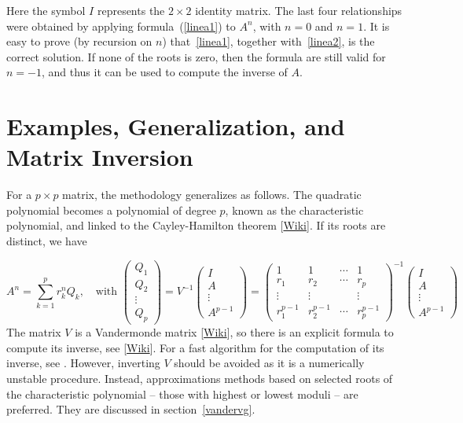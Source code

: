 \documentclass[oneside,10pt]{book}
\begin{document}
Here the symbol $I$ represents the $2 \times 2$ identity matrix. The last four relationships were obtained by applying formula~(\ref{linea1}) to $A^n$, with $n = 0$ and $n = 1$. 
It is easy to prove (by recursion on $n$) that~\ref{linea1}, together with~\ref{linea2}, is the correct solution. If none of the roots is zero, then the formula are still valid for $n = -1$, and thus it can be used to compute the inverse of $A$.

\section{Examples, Generalization, and Matrix Inversion}\label{slin1}

For a $p \times p$ matrix, the methodology generalizes as follows. The quadratic polynomial becomes a polynomial of degree $p$, known as the 
\textcolor{index}{characteristic polynomial}, and linked to the \textcolor{index}{Cayley-Hamilton theorem} [\href{https://en.wikipedia.org/wiki/Cayley\%E2\%80\%93Hamilton_theorem}{Wiki}]. If its roots are distinct, we have

\begin{equation}\label{linea11}
A^n=\sum_{k=1}^p r_k^n Q_k, \quad\text{with } \left(
\begin{aligned}
      Q_1\\
     Q_2 \\
     \vdots \\
    Q_p
\end{aligned}
\right) = V^{-1} \left(
\begin{array}{c}
      I \\
     A \\
     \vdots \\
    A^{p-1}
\end{array}
\right)  =\left(
\begin{array}{cccc}
      1 & 1 & \cdots & 1 \\
     r_1 & r_2 & \cdots & r_p \\
     \vdots & \vdots &  & \vdots \\
    r_1^{p-1} &  r_2^{p-1} &\cdots  &  r_p^{p-1}
\end{array}
\right)^{-1} \left(
\begin{array}{c}
      I \\
     A \\
     \vdots \\
    A^{p-1}
\end{array}
\right)
\end{equation}
The matrix $V$ is a \textcolor{index}{Vandermonde matrix} [\href{https://en.wikipedia.org/wiki/Vandermonde_matrix}{Wiki}], so there is an explicit formula to compute its inverse, 
see [\href{https://proofwiki.org/wiki/Inverse_of_Vandermonde_Matrix}{Wiki}]. 
For a fast algorithm for the computation of its inverse, see \cite{ieeevander}. However, inverting $V$ should be avoided as it is
a \textcolor{index}{numerically unstable} procedure. Instead, approximations methods based on selected roots of the characteristic polynomial -- those with  highest or lowest moduli -- are preferred. They are discussed in section~\ref{vandervg}.
\end{document}
